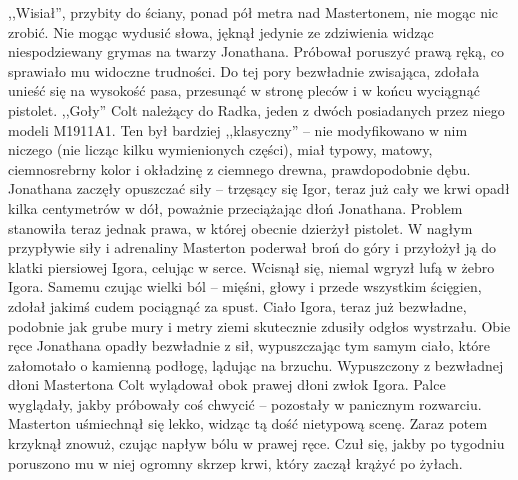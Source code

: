 \documentclass[../MAIN.tex]{subfiles}
\begin{document}
,,Wisiał'', przybity do ściany, ponad pół metra nad Mastertonem, nie mogąc nic zrobić.
Nie mogąc wydusić słowa, jęknął jedynie ze zdziwienia widząc niespodziewany grymas na twarzy Jonathana. Próbował poruszyć prawą ręką, co sprawiało mu widoczne trudności. Do tej pory bezwładnie zwisająca, zdołała unieść się na wysokość pasa, przesunąć w stronę pleców i w końcu wyciągnąć pistolet.
,,Goły'' Colt należący do Radka, jeden z dwóch posiadanych przez niego modeli M1911A1. Ten był bardziej ,,klasyczny'' -- nie modyfikowano w nim niczego (nie licząc kilku wymienionych części), miał typowy, matowy, ciemnosrebrny kolor i okładzinę z ciemnego drewna, prawdopodobnie dębu.
Jonathana zaczęły opuszczać siły -- trzęsący się Igor, teraz już cały we krwi opadł kilka centymetrów w dół, poważnie przeciążając dłoń Jonathana. Problem stanowiła teraz jednak prawa, w której obecnie dzierżył pistolet.
W nagłym przypływie siły i adrenaliny Masterton poderwał broń do góry i przyłożył ją do klatki piersiowej Igora, celując w serce. Wcisnął się, niemal wgryzł lufą w żebro Igora.
Samemu czując wielki ból -- mięśni, głowy i przede wszystkim ścięgien, zdołał jakimś cudem pociągnąć za spust. Ciało Igora, teraz już bezwładne, podobnie jak grube mury i metry ziemi skutecznie zdusiły odgłos wystrzału.
Obie ręce Jonathana opadły bezwładnie z sił, wypuszczając tym samym ciało, które załomotało o kamienną podłogę, lądując na brzuchu.
Wypuszczony z bezwładnej dłoni Mastertona Colt wylądował obok prawej dłoni zwłok Igora. Palce wyglądały, jakby próbowały coś chwycić -- pozostały w panicznym rozwarciu.
Masterton uśmiechnął się lekko, widząc tą dość nietypową scenę. Zaraz potem krzyknął znowuż, czując napływ bólu w prawej ręce.
Czuł się, jakby po tygodniu poruszono mu w niej ogromny skrzep krwi, który zaczął krążyć po żyłach.
\end{document}
